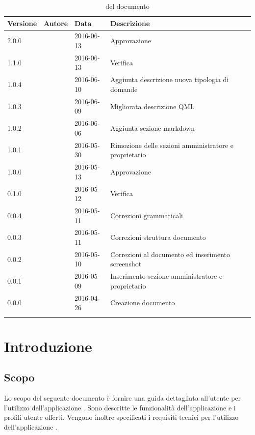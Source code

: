 \documentclass[12pt,a4paper]{article}
\begin{document}
	\begin{center}
		\begin{longtable}[H]{p{} p{} p{} p{}}
			\toprule
			\textbf{Versione}	&	\textbf{Autore}	&	\textbf{Data}	&	\textbf{Descrizione}\\*
			\midrule	
			\midrule
			2.0.0 & \AVE{} & 2016-06-13 & Approvazione \\*	
			\midrule
			1.1.0 & \AVI{} & 2016-06-13 & Verifica \\*	
			\midrule
			1.0.4 & \TP{} & 2016-06-10 & Aggiunta descrizione nuova tipologia di domande \\*	
			\midrule
			1.0.3 & \TP{} & 2016-06-09 & Migliorata descrizione QML \\*	
			\midrule
			1.0.2 & \WS{} & 2016-06-06 &  Aggiunta sezione markdown \\*	
			\midrule	
			1.0.1 & \AB{} & 2016-05-30 &  Rimozione delle sezioni amministratore e proprietario\\*		
			\midrule
			1.0.0 & \AVE{} & 2016-05-13 &  Approvazione \\*			
			\midrule
			0.1.0 & \TP{} & 2016-05-12 &  Verifica \\*
			\midrule
			0.0.4 & \WS{} & 2016-05-11 &  Correzioni grammaticali \\*
			\midrule
			0.0.3 & \WS{} & 2016-05-11 &  Correzioni struttura documento \\*
			\midrule
			0.0.2 & \WS{} & 2016-05-10 &  Correzioni al documento ed inserimento screenshot \\*
			\midrule
			0.0.1 & \WS{} & 2016-05-09 &  Inserimento sezione amministratore e proprietario \\*
			\midrule
			0.0.0 & \AB{} & 2016-04-26 &  Creazione documento \\*
			\bottomrule
			\caption{\mGls{versionamento}  del documento}
			\label{tabVers1}
		\end{longtable}
	\end{center}
	
	\newpage
	\tableofcontents
	\newpage
	\listoftables
	\listoffigures
	\newpage
	
	
	\section{Introduzione}	\label{intro}
	
	\subsection{Scopo}
	Lo scopo del seguente documento è fornire una guida dettagliata all’utente per l’utilizzo dell’applicazione \prj{}. Sono descritte le funzionalità dell'applicazione e i profili utente offerti.
	Vengono inoltre specificati i requisiti tecnici per l'utilizzo dell'applicazione \prj{}.
\end{document}
